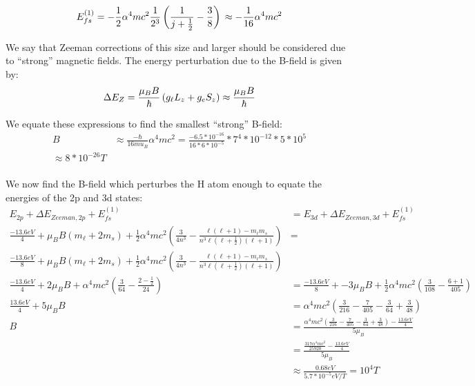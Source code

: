 \documentclass[10pt]{article} %
\begin{document}
\begin{equation*}
  E_{fs}^{(1)}
  = -\frac{1}{2}\alpha^4mc^2\frac{1}{2^3}\left(\frac{1}{j+\frac{1}{2}}-\frac{3}{8}\right)\\
  \approx -\frac{1}{16}\alpha^4mc^2\\
\end{equation*}

We say that Zeeman corrections of this size and larger should be considered due to ``strong''
magnetic fields. The energy perturbation due to the B-field is given by:\\

\begin{equation*}
  \Delta E_{Z} = \frac{\mu_B B}{\hbar}\left(g_\ell L_z + g_e S_z\right)
  \approx \frac{\mu_B B}{\hbar}\\
\end{equation*}

We equate these expressions to find the smallest ``strong'' B-field:\\

\begin{align*}
  B &\approx \frac{-\hbar}{16mu_B}\alpha^4mc^2
  = \frac{-6.5*10^{-16}}{16*6*10^{-5}}*7^4*10^{-12}*5*10^5\\
  \approx 8*10^{-26}T\\
\end{align*}

We now find the B-field which perturbes the H atom enough to equate the energies of the 2p and 3d
states:\\

\begin{align*}
  E_{2p} + \Delta E_{Zeeman, 2p} + E_{fs}^{(1)} &= E_{3d} + \Delta E_{Zeeman, 3d} + E_{fs}^{(1)}\\
  \frac{-13.6eV}{4} + \mu_BB(m_\ell+2m_s)
  + \frac{1}{2}\alpha^4mc^2\left(\frac{3}{4n^3}
  -\frac{\ell(\ell+1)-m_\ell m_s}{n^3\ell(\ell+\frac{1}{2})(\ell+1)}\right)
  &=\\ \frac{-13.6eV}{8} + \mu_BB(m_\ell+2m_s) + \frac{1}{2}\alpha^4mc^2\left(\frac{3}{4n^3}
  -\frac{\ell(\ell+1)-m_\ell m_s}{n^3\ell(\ell+\frac{1}{2})(\ell+1)}\right)\\
  \frac{-13.6eV}{4} + 2\mu_BB
  + \alpha^4mc^2\left(\frac{3}{64}
  -\frac{2-\frac{1}{2}}{24}\right)
  &= \frac{-13.6eV}{8} + -3\mu_BB + \frac{1}{2}\alpha^4mc^2\left(\frac{3}{108}
  -\frac{6+1}{405}\right)\\
  \frac{13.6eV}{4} + 5\mu_BB
  &= \alpha^4mc^2
  \left(\frac{3}{216} - \frac{7}{405} - \frac{3}{64} + \frac{3}{48}\right)\\
  B &= \frac{\alpha^4mc^2
    \left(\frac{3}{216} - \frac{7}{405} - \frac{3}{64} + \frac{3}{48}\right) - \frac{13.6eV}{4}}{5\mu_B}\\
  &= \frac{\frac{317\alpha^4mc^2}{25920} - \frac{13.6eV}{4}}{5\mu_B}\\
  &\approx \frac{0.68eV}{5.7*10^{-5}eV/T} = 10^4 T\\
\end{align*}
\end{document}
